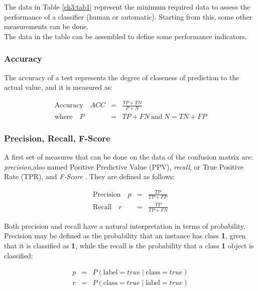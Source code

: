 The data in Table \ref{ch3:tab1} represent the minimum required data to assess the performance of a classifier (human or automatic).
Starting from this, some other measurements can be done.\\
The data in the table can be assembled to define some performance indicators.

\vspace{0.5cm}

\subsubsection{Accuracy}

The accuracy of a test represents the degree of closeness of prediction to the actual value, and it is measured as:

\begin{eqnarray}
 \textrm{Accuracy} \quad ACC & = & \frac{TP+TN}{P+N} \\
 \textrm{where} \quad P & = & TP + FN \ \textrm{and} \ N = TN + FP
\end{eqnarray}


\vspace{0.5cm}

\subsubsection{Precision, Recall, F-Score}

A first set of measures that can be done on the data of the confusion matrix are: \textit{precision},also named Positive Predictive Value (PPV),
\textit{recall}, or True Positive Rate (TPR), and \textit{F-Score} \cite{Precision_Recall_Fscore}.
They are defined as follows:

\begin{eqnarray}
 \textrm{Precision} \quad p & = & \frac{TP}{TP+FP} \\
 \textrm{Recall} \quad r & = &   \frac{TP}{TP+FN}
\end{eqnarray}

Both precision and recall have a natural interpretation in terms of probability. Precision may be defined as the probability that an instance
has class \textbf{1}, given that it is classified as \textbf{1}, while the recall is the probability that a class \textbf{1} object is classified:

\begin{eqnarray}
 p & = & P(\textrm{label} = true \mid \textrm{class} = true ) \\
 r & = & P(\textrm{class} = true \mid \textrm{label} = true )
\end{eqnarray}

